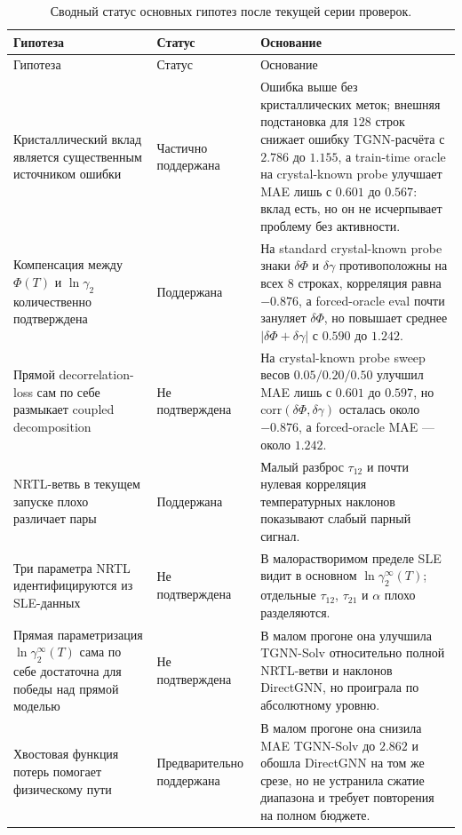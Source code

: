 \documentclass[11pt]{article}
\newcommand{\abs}[1]{\left\lvert #1 \right\rvert}
\theoremstyle{definition}
\begin{document}
{\small
\setlength{\LTleft}{0pt}
\setlength{\LTright}{0pt}
\begin{longtable}{P{0.29\textwidth}P{0.20\textwidth}P{0.43\textwidth}}
\caption{Сводный статус основных гипотез после текущей серии проверок.}\label{tab:hypotheses-status}\\
\toprule
Гипотеза & Статус & Основание \\
\midrule
\endfirsthead
\toprule
Гипотеза & Статус & Основание \\
\midrule
\endhead
\bottomrule
\endfoot
\bottomrule
\endlastfoot
Кристаллический вклад является существенным источником ошибки & Частично поддержана & Ошибка выше без кристаллических меток; внешняя подстановка для $128$ строк снижает ошибку TGNN-расчёта с $2.786$ до $1.155$, а train-time oracle на crystal-known probe улучшает MAE лишь с $0.601$ до $0.567$: вклад есть, но он не исчерпывает проблему без активности. \\
Компенсация между $\Phi(T)$ и $\ln\gamma_2$ количественно подтверждена & Поддержана & На standard crystal-known probe знаки $\delta\Phi$ и $\delta\gamma$ противоположны на всех $8$ строках, корреляция равна $-0.876$, а forced-oracle eval почти зануляет $\delta\Phi$, но повышает среднее $\abs{\delta\Phi+\delta\gamma}$ с $0.590$ до $1.242$. \\
Прямой decorrelation-loss сам по себе размыкает coupled decomposition & Не подтверждена & На crystal-known probe sweep весов $0.05/0.20/0.50$ улучшил MAE лишь с $0.601$ до $0.597$, но $\mathrm{corr}(\delta\Phi,\delta\gamma)$ осталась около $-0.876$, а forced-oracle MAE --- около $1.242$. \\
NRTL-ветвь в текущем запуске плохо различает пары & Поддержана & Малый разброс $\tau_{12}$ и почти нулевая корреляция температурных наклонов показывают слабый парный сигнал. \\
Три параметра NRTL идентифицируются из SLE-данных & Не подтверждена & В малорастворимом пределе SLE видит в основном $\ln\gamma_2^\infty(T)$; отдельные $\tau_{12}$, $\tau_{21}$ и $\alpha$ плохо разделяются. \\
Прямая параметризация $\ln\gamma_2^\infty(T)$ сама по себе достаточна для победы над прямой моделью & Не подтверждена & В малом прогоне она улучшила TGNN-Solv относительно полной NRTL-ветви и наклонов DirectGNN, но проиграла по абсолютному уровню. \\
Хвостовая функция потерь помогает физическому пути & Предварительно поддержана & В малом прогоне она снизила MAE TGNN-Solv до $2.862$ и обошла DirectGNN на том же срезе, но не устранила сжатие диапазона и требует повторения на полном бюджете. \\

\end{longtable}}
\end{document}
